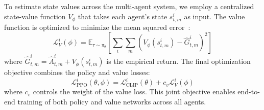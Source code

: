 To estimate state values across the multi-agent system, we employ a centralized state-value function $V_\phi$ that takes each agent's state $s_{t,m}^i$ as input. The value function is optimized to minimize the mean squared error~\citep{LoweWTHAM17}:
\begin{equation}
    \mathcal{L}_V^i(\phi) = \mathbb{E}_{\tau \sim \pi_\theta}\left[\sum_{t}\sum_{m} (V_\phi(s_{t,m}^i) - \hat{G}_{t,m}^i)^2\right]
\end{equation}
where $\hat{G}_{t,m}^i = \hat{A}_{t,m}^i + V_\phi(s_{t,m}^i)$ is the empirical return.
The final optimization objective combines the policy and value losses:
\begin{equation}
    \mathcal{L}_{\text{PPO}}^{i}(\theta, \phi) = \mathcal{L}_{\text{CLIP}}^{i}(\theta) + c_v \mathcal{L}_V^i(\phi)
\end{equation}
where $c_v$ controls the weight of the value loss. This joint objective enables end-to-end training of both policy and value networks across all agents.




